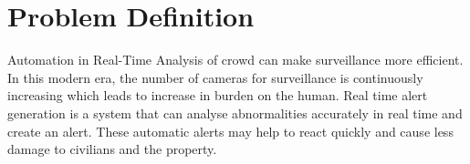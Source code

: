 \chapter{Problem Definition}

Automation in Real-Time Analysis of crowd can make surveillance more efficient. In this modern era, the number of cameras for surveillance is continuously increasing which leads to increase in burden on the human. Real time alert generation is a system that can analyse abnormalities accurately in real time and create an alert. These automatic alerts may help to react quickly and cause less damage to civilians and the property.
